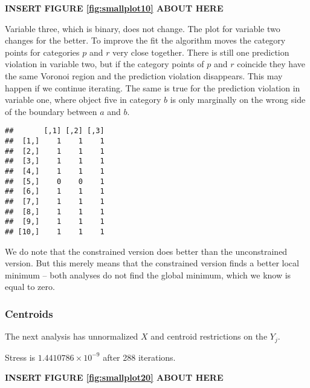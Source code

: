 \documentclass[
  12pt,
]{article}
\begin{document}
\begin{greybox}

\begin{center}
\textbf{INSERT FIGURE \ref{fig:smallplot10} ABOUT HERE}

\end{center}

\end{greybox}

Variable three, which is binary, does not change. The plot for variable two changes for the better. To improve the fit the algorithm moves the
category points for categories \(p\) and \(r\) very close together. There is
still one prediction violation in variable two, but
if the category points of \(p\) and \(r\) coincide they have the same Voronoi
region and the prediction violation disappears. This may happen if we
continue iterating. The same is true for the prediction violation in
variable one, where object five in category \(b\) is only marginally on the wrong side of the
boundary between \(a\) and \(b\).

\begin{verbatim}
##       [,1] [,2] [,3]
##  [1,]    1    1    1
##  [2,]    1    1    1
##  [3,]    1    1    1
##  [4,]    1    1    1
##  [5,]    0    0    1
##  [6,]    1    1    1
##  [7,]    1    1    1
##  [8,]    1    1    1
##  [9,]    1    1    1
## [10,]    1    1    1
\end{verbatim}

We do note that the constrained version does better than the
unconstrained version. But this merely means that the constrained
version finds a better local minimum -- both analyses do not
find the global minimum, which we know is equal to zero.

\subsubsection{Centroids}\label{centroids}

The next analysis has unnormalized \(X\) and centroid restrictions
on the \(Y_j\).

Stress is \ensuremath{1.4410786\times 10^{-9}} after 288 iterations.

\begin{greybox}

\begin{center}
\textbf{INSERT FIGURE \ref{fig:smallplot20} ABOUT HERE}

\end{center}

\end{greybox}
\end{document}
